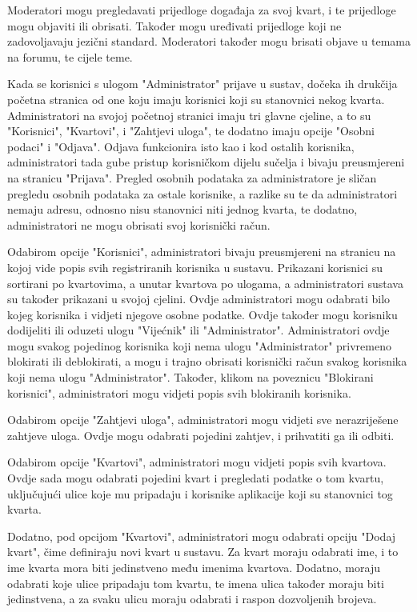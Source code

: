 	Moderatori mogu pregledavati prijedloge događaja za svoj kvart, i te prijedloge mogu objaviti ili obrisati. Također mogu uređivati prijedloge koji ne zadovoljavaju jezični standard. Moderatori također mogu brisati objave u temama na forumu, te cijele teme.
	
	Kada se korisnici s ulogom "Administrator" prijave u sustav, dočeka ih drukčija početna stranica od one koju imaju korisnici koji su stanovnici nekog kvarta. Administratori na svojoj početnoj stranici imaju tri glavne cjeline, a to su "Korisnici", "Kvartovi", i "Zahtjevi uloga", te dodatno imaju opcije "Osobni podaci" i "Odjava". Odjava funkcionira isto kao i kod ostalih korisnika, administratori tada gube pristup korisničkom dijelu sučelja i bivaju preusmjereni na stranicu "Prijava". Pregled osobnih podataka za administratore je sličan pregledu osobnih podataka za ostale korisnike, a razlike su te da administratori nemaju adresu, odnosno nisu stanovnici niti jednog kvarta, te dodatno, administratori ne mogu obrisati svoj korisnički račun.
	
	Odabirom opcije "Korisnici", administratori bivaju preusmjereni na stranicu na kojoj vide popis svih registriranih korisnika u sustavu. Prikazani korisnici su sortirani po kvartovima, a unutar kvartova po ulogama, a administratori sustava su također prikazani u svojoj cjelini. Ovdje administratori mogu odabrati bilo kojeg korisnika i vidjeti njegove osobne podatke. Ovdje također mogu korisniku dodijeliti ili oduzeti ulogu "Vijećnik" ili "Administrator". Administratori ovdje mogu svakog pojedinog korisnika koji nema ulogu "Administrator" privremeno blokirati ili deblokirati, a mogu i trajno obrisati korisnički račun svakog korisnika koji nema ulogu "Administrator". Također, klikom na poveznicu "Blokirani korisnici", administratori mogu vidjeti popis svih blokiranih korisnika.
	
	Odabirom opcije "Zahtjevi uloga", administratori mogu vidjeti sve nerazriješene zahtjeve uloga. Ovdje mogu odabrati pojedini zahtjev, i prihvatiti ga ili odbiti. 
	
	Odabirom opcije "Kvartovi", administratori mogu vidjeti popis svih kvartova. Ovdje sada mogu odabrati pojedini kvart i pregledati podatke o tom kvartu, uključujući ulice koje mu pripadaju i korisnike aplikacije koji su stanovnici tog kvarta.
	
	Dodatno, pod opcijom "Kvartovi", administratori mogu odabrati opciju "Dodaj kvart", čime definiraju novi kvart u sustavu. Za kvart moraju odabrati ime, i to ime kvarta mora biti jedinstveno među imenima kvartova. Dodatno, moraju odabrati koje ulice pripadaju tom kvartu, te imena ulica također moraju biti jedinstvena, a za svaku ulicu moraju odabrati i raspon dozvoljenih brojeva.
	
